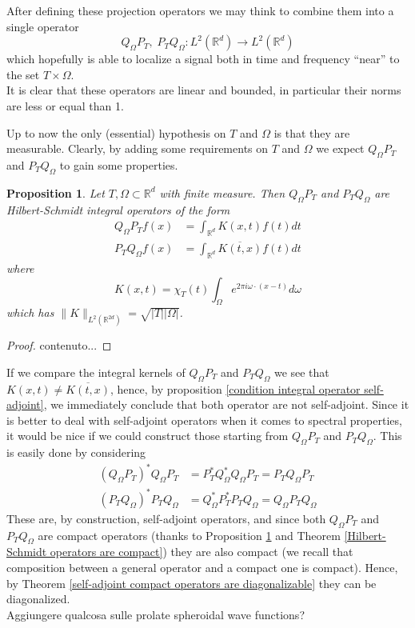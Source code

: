 \documentclass[corpo=11pt, stile=classica, tipotesi=custom,
greek, evenboxes, english]{toptesi}
\numberwithin{equation}{chapter}
\newtheorem{prop}[teo]{Proposition}
\newcommand{\R}{\mathbb{R}} %
\begin{document}
After defining these projection operators we may think to combine them into a single operator
\begin{equation*}\label{composition of projections}
	Q_{\Omega} P_T, \; P_T Q_{\Omega} : L^2(\R^d) \rightarrow L^2(\R^d)
\end{equation*}
which hopefully is able to localize a signal both in time and frequency ``near'' to the set $T \times \Omega$.\\
It is clear that these operators are linear and bounded, in particular their norms are less or equal than 1.

Up to now the only (essential) hypothesis on $T$ and $\Omega$ is that they are measurable. Clearly, by adding some requirements on $T$ and $\Omega$ we expect $Q_{\Omega} P_T$ and $P_T Q_{\Omega}$ to gain some properties.
\begin{prop}\label{projection operators are Hilbert-Schmidt}
	Let $T,\Omega \subset \R^d$ with finite measure. Then $Q_{\Omega} P_T$ and $P_T Q_{\Omega}$ are Hilbert-Schmidt integral operators of the form
	\begin{align}
		Q_{\Omega} P_T f(x) &= \int_{\R^d} K(x,t) f(t) dt \\
		P_T Q_{\Omega} f(x) &= \int_{\R^d} \overline{K(t,x)}f(t)dt
	\end{align}
	where
	\begin{equation}\label{integral kernel projection operators}
		K(x,t) = \chi_T(t) \int_{\Omega} e^{2 \pi i \omega \cdot (x-t)}d\omega
	\end{equation}
	which has $\| K \|_{L^2(\R^{2d})} = \sqrt{|T||\Omega|}$.
\end{prop}
\begin{proof}
	contenuto...
\end{proof}
If we compare the integral kernels of $Q_{\Omega} P_T$ and $P_T Q_{\Omega}$ we see that $K(x,t) \neq \overline{K(t,x)}$, hence, by proposition \ref{condition integral operator self-adjoint}, we immediately conclude that both operator are not self-adjoint. {\color{red} Since it is better to deal with self-adjoint operators when it comes to spectral properties, it would be nice if we could construct those starting from $Q_{\Omega} P_T$ and $P_T Q_{\Omega}$.} This is easily done by considering
\begin{align}
	(Q_{\Omega} P_T)^* Q_{\Omega} P_T &= P_T^* Q_{\Omega}^* Q_{\Omega} P_T= P_T Q_{\Omega} P_T\\
	(P_T Q_{\Omega})^* P_T Q_{\Omega} &= Q_{\Omega}^* P_T^* P_T Q_{\Omega} = Q_{\Omega} P_T Q_{\Omega}
\end{align} 
These are, by construction, self-adjoint operators, and since both $Q_{\Omega} P_T$ and $P_T Q_{\Omega}$ are compact operators (thanks to Proposition \ref{projection operators are Hilbert-Schmidt} and Theorem \ref{Hilbert-Schmidt operators are compact}) they are also compact (we recall that composition between a general operator and a compact one is compact). Hence, by Theorem \ref{self-adjoint compact operators are diagonalizable} they can be diagonalized.\\
{\color{red} Aggiungere qualcosa sulle prolate spheroidal wave functions?}
\end{document}
